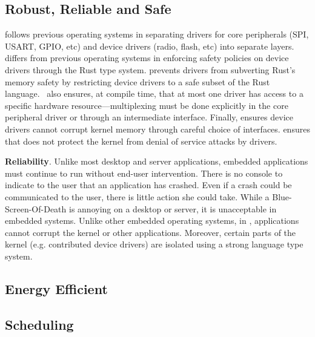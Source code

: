 \subsection{Robust, Reliable and Safe}
 \name follows previous operating systems in separating
drivers for core peripherals (SPI, USART, GPIO, etc) and device drivers (radio,
flash, etc) into separate layers. \name differs from previous operating systems
in enforcing safety policies on device drivers through the Rust type system.
\name prevents drivers from subverting Rust's memory safety by restricting
device drivers to a safe subset of the Rust language.~ \name
also ensures, at compile time, that at most one driver has access to a specific
hardware resource---multiplexing must be done explicitly in the core peripheral
driver or through an intermediate interface. Finally, \name ensures device
drivers cannot corrupt kernel memory through careful choice of interfaces. \name
ensures that \name does not protect the kernel from denial of service attacks by
drivers.

{\bf Reliability}. Unlike most desktop and server applications, embedded
applications must continue to run without end-user intervention. There is no
console to indicate to the user that an application has crashed. Even if a crash
could be communicated to the user, there is little action she could take. While
a Blue-Screen-Of-Death is annoying on a desktop or server, it is unacceptable in
embedded systems. Unlike other embedded operating systems, in \name,
applications cannot corrupt the kernel or other applications. Moreover, certain
parts of the kernel (e.g. contributed device drivers) are isolated using
a strong language type system.

\subsection{Energy Efficient}


\subsection{Scheduling}

